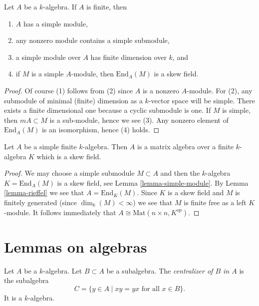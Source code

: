 \begin{lemma}
\label{lemma-simple-module}
Let $A$ be a $k$-algebra. If $A$ is finite, then
\begin{enumerate}
\item $A$ has a simple module,
\item any nonzero module contains a simple submodule,
\item a simple module over $A$ has finite dimension over $k$, and
\item if $M$ is a simple $A$-module, then $\text{End}_A(M)$ is a
skew field.
\end{enumerate}
\end{lemma}

\begin{proof}
Of course (1) follows from (2) since $A$ is a nonzero $A$-module.
For (2), any submodule of minimal (finite) dimension as a $k$-vector
space will be simple. There exists a finite dimensional one
because a cyclic submodule is one. If $M$ is simple, then
$mA \subset M$ is a sub-module, hence we see (3). Any nonzero element
of $\text{End}_A(M)$ is an isomorphism, hence (4) holds.
\end{proof}

\begin{theorem}
\label{theorem-wedderburn}
Let $A$ be a simple finite $k$-algebra. Then $A$ is a matrix algebra over
a finite $k$-algebra $K$ which is a skew field.
\end{theorem}

\begin{proof}
We may choose a simple submodule $M \subset A$ and then
the $k$-algebra $K = \text{End}_A(M)$ is a skew field, see
Lemma \ref{lemma-simple-module}.
By
Lemma \ref{lemma-rieffel}
we see that $A = \text{End}_K(M)$. Since $K$ is a skew field and
$M$ is finitely generated (since $\dim_k(M) < \infty$) we see that
$M$ is finite free as a left $K$-module. It follows immediately that
$A \cong \text{Mat}(n \times n, K^{op})$.
\end{proof}






\section{Lemmas on algebras}
\label{section-lemmas}

\noindent
Let $A$ be a $k$-algebra. Let $B \subset A$ be a subalgebra.
The {\it centralizer of $B$ in $A$} is the subalgebra
$$
C  = \{y \in A \mid xy = yx \text{ for all }x \in B\}.
$$
It is a $k$-algebra.

